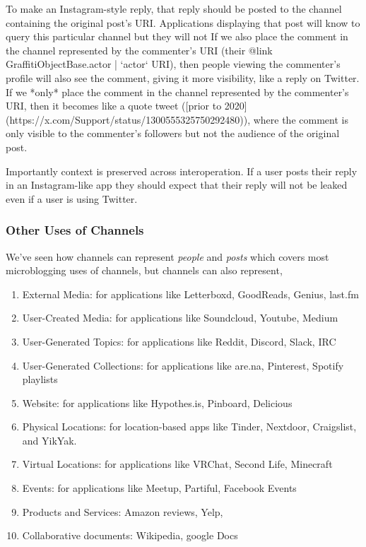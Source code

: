 To make an Instagram-style reply, that reply should be posted to the channel
containing the original post's URI.
Applications displaying that post will know to query this particular channel
but they will not
If we also place the comment in the channel represented by the commenter's URI (their
{@link GraffitiObjectBase.actor | `actor` URI}), then people viewing the commenter's profile
will also see the comment, giving it more visibility, like a reply on Twitter.
If we *only* place the comment in the channel represented by the commenter's URI, then
it becomes like a quote tweet ([prior to 2020](https://x.com/Support/status/1300555325750292480)),
where the comment is only visible to the commenter's followers but not the audience
of the original post.

Importantly context is preserved across interoperation. If a user posts their reply in
an Instagram-like app they should expect that their reply will not be leaked even if
a user is using Twitter.

\subsubsection{Other Uses of Channels}

We've seen how channels can represent \emph{people} and \emph{posts}
which covers most microblogging uses of channels, but channels can also represent,

\begin{enumerate}
\item
External Media: for applications like Letterboxd, GoodReads, Genius, last.fm
\item
User-Created Media: for applications like Soundcloud, Youtube, Medium
\item
User-Generated Topics: for applications like Reddit, Discord, Slack, IRC
\item
User-Generated Collections: for applications like are.na, Pinterest, Spotify playlists
\item
Website: for applications like Hypothes.is, Pinboard, Delicious
\item
Physical Locations: for location-based apps like Tinder, Nextdoor, Craigslist, and YikYak.
\item
Virtual Locations: for applications like VRChat, Second Life, Minecraft
\item
Events: for applications like Meetup, Partiful, Facebook Events
\item
Products and Services: Amazon reviews, Yelp,
\item
Collaborative documents: Wikipedia, google Docs
\end{enumerate}

